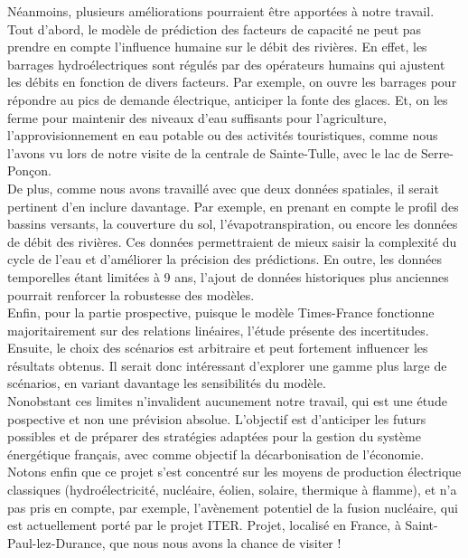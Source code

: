 \documentclass{article}
\theoremstyle{nopointbreak}
\theoremstyle{nobrkbold}
\begin{document}
    Néanmoins, plusieurs améliorations pourraient être apportées à notre travail. \\
    
    Tout d'abord, le modèle de prédiction des facteurs de capacité ne peut pas prendre en compte 
l'influence humaine sur le débit des rivières. En effet, les barrages hydroélectriques sont régulés
par des opérateurs humains qui ajustent les débits en fonction de divers facteurs.
Par exemple, on ouvre les barrages pour répondre au pics de demande électrique,
anticiper la fonte des glaces. Et, on les ferme pour maintenir des niveaux d'eau
suffisants pour l'agriculture, l'approvisionnement en eau potable ou des activités 
touristiques, comme nous l'avons vu lors de notre visite de la centrale de Sainte-Tulle, 
avec le lac de Serre-Ponçon.\\

    De plus, comme nous avons travaillé avec que deux données spatiales, il serait pertinent 
d'en inclure davantage. Par exemple, en prenant en compte le profil des bassins versants,
la couverture du sol, l'évapotranspiration, ou encore les données de débit des rivières.
Ces données permettraient de mieux saisir la complexité du cycle de l'eau et d'améliorer
la précision des prédictions. En outre, les données temporelles étant limitées à 9 ans,
l'ajout de données historiques plus anciennes pourrait renforcer la robustesse des modèles.\\

    Enfin, pour la partie prospective, puisque le modèle Times-France fonctionne majoritairement
sur des relations linéaires, l'étude présente des incertitudes. Ensuite, le choix 
des scénarios est arbitraire et peut fortement influencer les résultats obtenus. Il serait 
donc intéressant d'explorer une gamme plus large de scénarios, en variant davantage les 
sensibilités du modèle.\\

    Nonobstant ces limites n'invalident aucunement notre travail, qui est une étude pospective
et non une prévision absolue. L'objectif est d'anticiper les futurs possibles
et de préparer des stratégies adaptées pour la gestion du système énergétique français,
avec comme objectif la décarbonisation de l'économie.\\

    Notons enfin que ce projet s'est concentré sur les moyens de production électrique
classiques (hydroélectricité, nucléaire, éolien, solaire, thermique à flamme),
et n'a pas pris en compte, par exemple, l'avènement potentiel de la fusion nucléaire,
qui est actuellement porté par le projet ITER. Projet, localisé en France, 
à Saint-Paul-lez-Durance, que nous nous avons la chance de visiter ! \\
\end{document}

